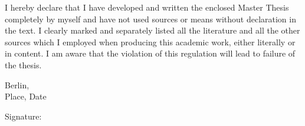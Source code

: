 \documentclass[12pt,a4paper,oneside]{report}
\begin{document}
\noindent I hereby declare that I have developed and written the enclosed Master Thesis completely by myself and have not used sources or means without declaration in the text. I clearly marked and separately listed all the literature and all the other sources which I employed when producing this academic work, either literally or in content. I am aware that the violation of this regulation will lead to failure of the thesis.

\vspace{2.5em}
\noindent Berlin, \underline{\hspace{6.5cm}}\\[0.4em]
{\small Place, Date}

\vspace{2.5em}
\noindent Signature: \underline{\hspace{7cm}}

\vspace{2em}

\clearpage
\tableofcontents

\clearpage
\end{document}
